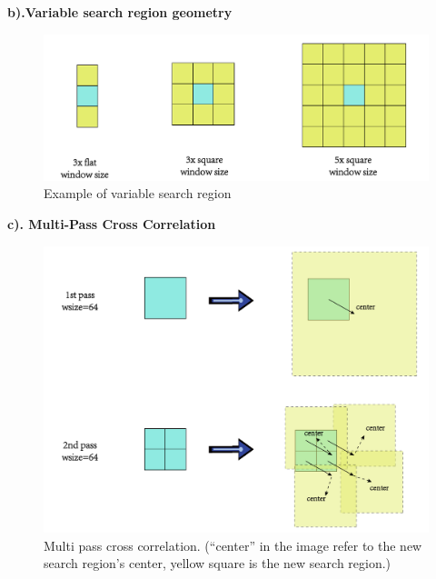 \textbf{b).Variable search region geometry}
\begin{figure}[h!]
	\centering
	\includegraphics[width=1\linewidth]{figures/part2/search_region}
	\caption{Example of variable search region}
	\label{fig:search_region}
\end{figure}

\textbf{c). Multi-Pass Cross Correlation}
\begin{figure}[h!]
	\centering
	\includegraphics[width=1\linewidth]{figures/part2/multi_pass}
	\caption{Multi pass cross correlation. (``center'' in the image refer to the new search region's center, yellow square is the new search region.)}
	\label{fig:multi_pass}
\end{figure}
